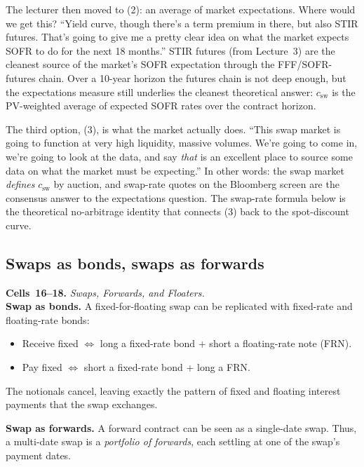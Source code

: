 The lecturer then moved to (2): an average of market expectations. Where
would we get this? ``Yield curve, though there's a term premium in there,
but also STIR futures. That's going to give me a pretty clear idea on
what the market expects SOFR to do for the next 18 months.'' STIR futures
(from Lecture~3) are the cleanest source of the market's SOFR expectation
through the FFF/SOFR-futures chain. Over a 10-year horizon the futures
chain is not deep enough, but the expectations measure still underlies
the cleanest theoretical answer: $c_{\text{sw}}$ is the PV-weighted
average of expected SOFR rates over the contract horizon.

The third option, (3), is what the market actually does. ``This swap
market is going to function at very high liquidity, massive volumes. We're
going to come in, we're going to look at the data, and say \emph{that} is
an excellent place to source some data on what the market must be
expecting.'' In other words: the swap market \emph{defines}
$c_{\text{sw}}$ by auction, and swap-rate quotes on the Bloomberg screen
are the consensus answer to the expectations question. The swap-rate
formula below is the theoretical no-arbitrage identity that connects
(3) back to the spot-discount curve.

\subsection{Swaps as bonds, swaps as forwards}\label{L4-sec:sw-asbonds}

\begin{keyblock}
\textbf{Cells~16--18.} \emph{Swaps, Forwards, and Floaters.}\\
\textbf{Swap as bonds.} A fixed-for-floating swap can be replicated with
fixed-rate and floating-rate bonds:
\begin{itemize}
  \item Receive fixed $\Leftrightarrow$ long a fixed-rate bond + short a
        floating-rate note (FRN).
  \item Pay fixed $\Leftrightarrow$ short a fixed-rate bond + long a FRN.
\end{itemize}
The notionals cancel, leaving exactly the pattern of fixed and floating
interest payments that the swap exchanges.

\textbf{Swap as forwards.} A forward contract can be seen as a
single-date swap. Thus, a multi-date swap is a \emph{portfolio of
forwards}, each settling at one of the swap's payment dates.
\end{keyblock}

